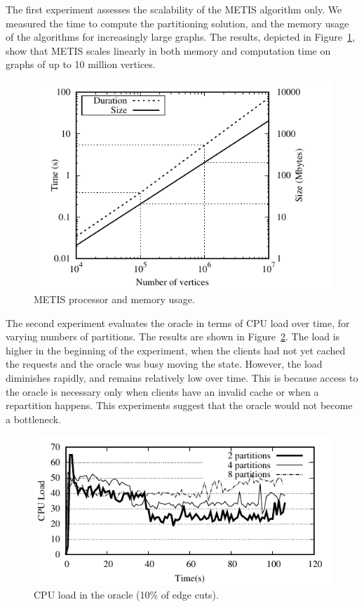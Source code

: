 The first experiment assesses the scalability of the METIS algorithm only.
We measured the time to compute the partitioning solution, and
the memory usage of the algorithms for increasingly large graphs. 
The results, depicted in Figure~\ref{fig:metis_size_time}, show that METIS scales
linearly in both memory and computation time on graphs of up to 10 million vertices.

\begin{figure}[ht!]
  \centering
    \includegraphics[width=\columnwidth]{figures/metis_size_time}
	\caption{METIS processor and memory usage.}
	\label{fig:metis_size_time}
\end{figure}

The second experiment evaluates the oracle in terms of CPU load over
time, for varying numbers of partitions. The results are shown in
Figure~\ref{fig:cpu_oracle}. The load is higher in the
beginning of the experiment, when the clients had not yet cached the
requests and the oracle was busy moving the state. However, the load diminishes rapidly, and remains relatively
low over time. This is because access to the oracle is necessary only
when clients have an invalid cache or when a repartition happens. This experiments
suggest that the oracle would not become a bottleneck.%

\begin{figure}[ht]
	\includegraphics[width=\columnwidth]{figures/socc/socc-oracle-load}
	\caption{CPU load in the oracle (10\% of edge cuts).}
	\label{fig:cpu_oracle}
\end{figure}

